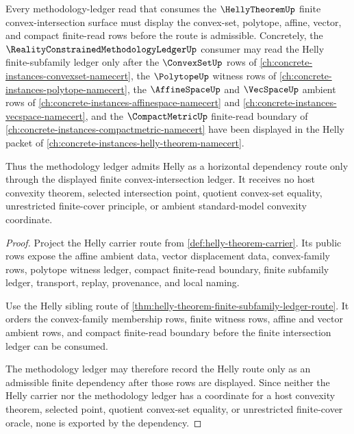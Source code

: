 \begin{theorem}
\label{thm:realityconstrainedmethodologyledger-methodology-sibling-route}
Every methodology-ledger read that consumes the $\HellyTheoremUp$ finite convex-intersection surface must display the convex-set, polytope, affine, vector, and compact finite-read rows before the route is admissible. Concretely, the $\RealityConstrainedMethodologyLedgerUp$ consumer may read the Helly finite-subfamily ledger only after the $\ConvexSetUp$ rows of \autoref{ch:concrete-instances-convexset-namecert}, the $\PolytopeUp$ witness rows of \autoref{ch:concrete-instances-polytope-namecert}, the $\AffineSpaceUp$ and $\VecSpaceUp$ ambient rows of \autoref{ch:concrete-instances-affinespace-namecert} and \autoref{ch:concrete-instances-vecspace-namecert}, and the $\CompactMetricUp$ finite-read boundary of \autoref{ch:concrete-instances-compactmetric-namecert} have been displayed in the Helly packet of \autoref{ch:concrete-instances-helly-theorem-namecert}.

Thus the methodology ledger admits Helly as a horizontal dependency route only through the displayed finite convex-intersection ledger. It receives no host convexity theorem, selected intersection point, quotient convex-set equality, unrestricted finite-cover principle, or ambient standard-model convexity coordinate.
\end{theorem}
\begin{proof}
Project the Helly carrier route from \autoref{def:helly-theorem-carrier}. Its public rows expose the affine ambient data, vector displacement data, convex-family rows, polytope witness ledger, compact finite-read boundary, finite subfamily ledger, transport, replay, provenance, and local naming.

Use the Helly sibling route of \autoref{thm:helly-theorem-finite-subfamily-ledger-route}. It orders the convex-family membership rows, finite witness rows, affine and vector ambient rows, and compact finite-read boundary before the finite intersection ledger can be consumed.

The methodology ledger may therefore record the Helly route only as an admissible finite dependency after those rows are displayed. Since neither the Helly carrier nor the methodology ledger has a coordinate for a host convexity theorem, selected point, quotient convex-set equality, or unrestricted finite-cover oracle, none is exported by the dependency.
\end{proof}
